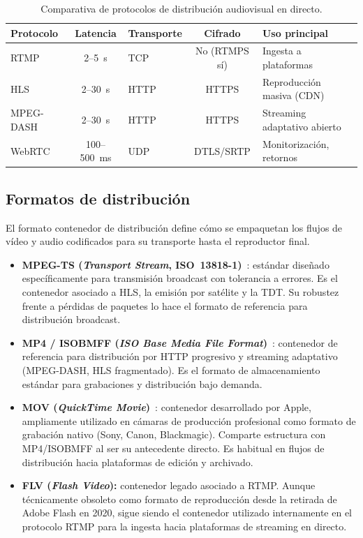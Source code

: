 \begin{table}[H]
  \centering
  \caption{Comparativa de protocolos de distribución audiovisual en directo.}
  \label{tab:distribucion_protocolos}
  \small
  \begin{tabularx}{\linewidth}{|l|c|l|c|X|}
    \hline
    \textbf{Protocolo} & \textbf{Latencia} & \textbf{Transporte} & \textbf{Cifrado} & \textbf{Uso principal} \\
    \hline
    RTMP      & 2--5~s      & TCP    & No (RTMPS sí) & Ingesta a plataformas \\
    HLS       & 2--30~s     & HTTP   & HTTPS         & Reproducción masiva (CDN) \\
    MPEG-DASH & 2--30~s     & HTTP   & HTTPS         & Streaming adaptativo abierto \\
    WebRTC    & 100--500~ms & UDP    & DTLS/SRTP     & Monitorización, retornos \\
    \hline
  \end{tabularx}
\end{table}

\subsection{Formatos de distribución}

El formato contenedor de distribución define cómo se empaquetan los flujos de vídeo y
audio codificados para su transporte hasta el reproductor final.

\begin{itemize}
  \item \textbf{MPEG-TS (\textit{Transport Stream}, ISO~13818-1)}~\cite{iso_mpegts}:
  estándar diseñado específicamente para transmisión broadcast con tolerancia a errores.
  Es el contenedor asociado a HLS, la emisión por satélite y la TDT. Su robustez frente
  a pérdidas de paquetes lo hace el formato de referencia para distribución broadcast.

  \item \textbf{MP4 / ISOBMFF (\textit{ISO Base Media File Format})}~\cite{iso_isobmff}:
  contenedor de referencia para distribución por HTTP progresivo y streaming adaptativo
  (MPEG-DASH, HLS fragmentado). Es el formato de almacenamiento estándar para
  grabaciones y distribución bajo demanda.

  \item \textbf{MOV (\textit{QuickTime Movie})}~\cite{apple_quicktime}: contenedor
  desarrollado por Apple, ampliamente utilizado en cámaras de producción profesional
  como formato de grabación nativo (Sony, Canon, Blackmagic). Comparte estructura
  con MP4/ISOBMFF al ser su antecedente directo. Es habitual en flujos de distribución
  hacia plataformas de edición y archivado.

  \item \textbf{FLV (\textit{Flash Video}):} contenedor legado asociado a RTMP. Aunque
  técnicamente obsoleto como formato de reproducción desde la retirada de Adobe Flash en
  2020, sigue siendo el contenedor utilizado internamente en el protocolo RTMP para la
  ingesta hacia plataformas de streaming en directo.
\end{itemize}

